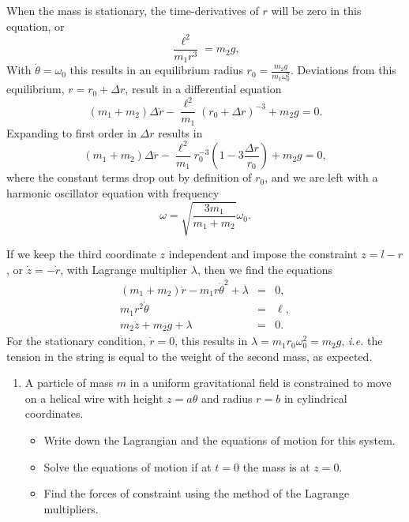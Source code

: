 \documentclass[letterpaper,11pt]{article}
\begin{document}
When the mass is stationary, the time-derivatives of $r$ will be zero in this equation, or
\begin{equation*}
 \frac{\ell^2}{m_1 r^3} = m_2 g,
\end{equation*}
With $\dot{\theta} = \omega_0$ this results in an equilibrium radius $r_0 = \frac{m_2 g}{m_1 \omega_0^2}$.  Deviations from this equilibrium, $r = r_0 + \Delta r$, result in a differential equation
\begin{equation*}
 (m_1 + m_2) \Delta\ddot{r} - \frac{\ell^2}{m_1} (r_0 + \Delta r)^{-3} + m_2 g = 0.
\end{equation*}
Expanding to first order in $\Delta r$ results in
\begin{equation*}
 (m_1 + m_2) \Delta\ddot{r} - \frac{\ell^2}{m_1} r_0^{-3} (1 - 3 \frac{\Delta r}{r_0}) + m_2 g = 0,
\end{equation*}
where the constant terms drop out by definition of $r_0$, and we are left with a harmonic oscillator equation with frequency
\begin{equation*}
 \omega = \sqrt{\frac{3 m_1}{m_1 + m_2}} \omega_0.
\end{equation*}

If we keep the third coordinate $z$ independent and impose the constraint $z = l - r$, or $\dot{z} = -\dot{r}$, with Lagrange multiplier $\lambda$, then we find the equations
\begin{eqnarray*}
 (m_1 + m_2) \ddot{r} - m_1 r \dot{\theta}^2 + \lambda & = & 0, \\
 m_1 r^2 \dot{\theta} & = & \ell, \\
 m_2 \ddot{z} + m_2 g + \lambda & = & 0.
\end{eqnarray*}
For the stationary condition, $\dot{r} = 0$, this results in $\lambda = m_1 r_0 \omega_0^2 = m_2 g$, \textit{i.e.} the tension in the string is equal to the weight of the second mass, as expected.


\begin{enumerate}[resume]
 \item A particle of mass $m$ in a uniform gravitational field is constrained to move on a helical wire with height $z = a\theta$ and radius $r = b$ in cylindrical coordinates.
 \begin{itemize}
  \item Write down the Lagrangian and the equations of motion for this system.
  \item Solve the equations of motion if at $t = 0$ the mass is at $z = 0$.
  \item Find the forces of constraint using the method of the Lagrange multipliers.
 \end{itemize}
\end{enumerate}
\end{document}
